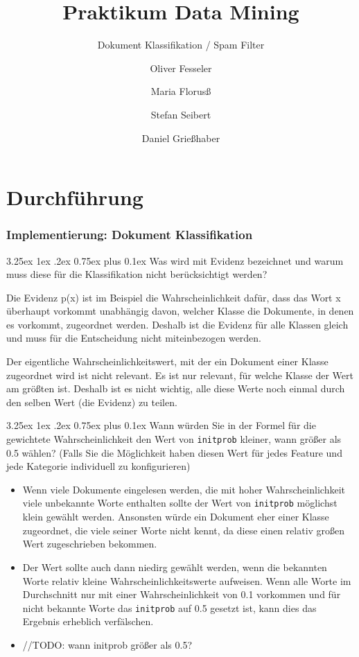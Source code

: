 \documentclass[12pt,a4paper]{scrartcl}
\makeatletter
\renewcommand\subparagraph{\@startsection{subparagraph}{5}{\parindent}%
    {3.25ex \@plus1ex \@minus .2ex}%
    {0.75ex plus 0.1ex}%
    {\normalfont\normalsize\bfseries}}
\makeatother
\begin{document}
\title{Praktikum Data Mining}
\subtitle{Dokument Klassifikation / Spam Filter}
\author{Oliver Fesseler \and Maria Florus\ss \and Stefan Seibert \and  Daniel Grie\ss haber}
\maketitle
\newpage

\part*{ Durchf\"uhrung}

\section*{Implementierung: Dokument Klassifikation}
\subparagraph{Was wird mit Evidenz bezeichnet und warum muss diese f\"ur die Klassifikation nicht ber\"ucksichtigt werden?}

Die Evidenz p(x) ist im Beispiel die Wahrscheinlichkeit daf\"ur, dass das Wort x \"uberhaupt vorkommt unabh\"angig davon, welcher Klasse die Dokumente, in denen es vorkommt, zugeordnet werden.
Deshalb ist die Evidenz f\"ur alle Klassen gleich und muss f\"ur die Entscheidung nicht miteinbezogen werden. 

Der eigentliche Wahrscheinlichkeitswert, mit der ein Dokument einer Klasse zugeordnet wird ist nicht relevant. Es ist nur relevant, f\"ur welche Klasse der Wert am gr\"o\ss ten ist. Deshalb ist es nicht wichtig, alle diese Werte noch einmal durch den selben Wert (die Evidenz) zu teilen.

\subparagraph{Wann w\"urden Sie in der Formel f\"ur die gewichtete Wahrscheinlichkeit den Wert von \lstinline{initprob} kleiner, wann gr\"o\ss er als 0.5 w\"ahlen? (Falls Sie die M\"oglichkeit haben diesen Wert f\"ur jedes Feature und jede Kategorie individuell zu konfigurieren)}

\begin{itemize}
\item{ Wenn viele Dokumente eingelesen werden, die mit hoher Wahrscheinlichkeit viele unbekannte Worte enthalten sollte der Wert von \lstinline{initprob} m\"oglichst klein gew\"ahlt werden. Ansonsten w\"urde ein Dokument eher einer Klasse zugeordnet, die viele seiner Worte nicht kennt, da diese einen relativ gro\ss en Wert zugeschrieben bekommen. }
\item{ Der Wert sollte auch dann niedirg gew\"ahlt werden, wenn die bekannten Worte relativ kleine Wahrscheinlichkeitswerte aufweisen. Wenn alle Worte im Durchschnitt nur mit einer Wahrscheinlichkeit von 0.1 vorkommen und f\"ur nicht bekannte Worte das \lstinline{initprob} auf 0.5 gesetzt ist, kann dies das Ergebnis erheblich verf\"alschen.}
\item{ //TODO: wann initprob gr\"o\ss er als 0.5?} 
\end{itemize} 
\end{document}
